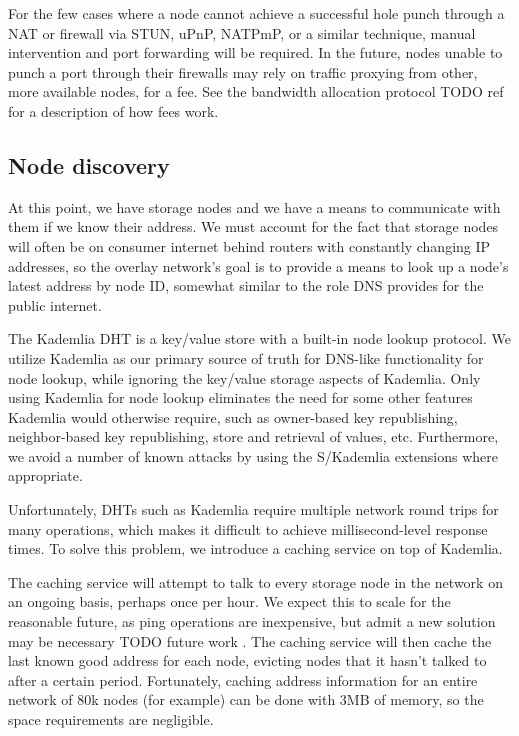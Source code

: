 \documentclass[a4paper,10pt]{article} \usepackage[utf8]{inputenc}
\newcommand{\todo}[1]{{\color{red} TODO #1 }}
\begin{document}
For the few cases where a node cannot achieve a successful hole punch through a
NAT or firewall via STUN, uPnP, NATPmP, or a similar technique, manual
intervention and port forwarding will be required. In the future, nodes unable
to punch a port through their firewalls may rely on traffic proxying from
other, more available nodes, for a fee. See the bandwidth allocation protocol
\todo{ref} for a description of how fees work.

\subsection{Node discovery}

At this point, we have storage nodes and we have a means to communicate with
them if we know their address. We must account for the fact that storage nodes
will often be on consumer internet behind routers with constantly changing IP
addresses, so the overlay network's goal is to provide a means to look up a
node's latest address by node ID, somewhat similar to the role DNS provides
for the public internet.

The Kademlia DHT is a key/value store with a built-in node lookup protocol.
We utilize Kademlia as our primary source of truth for DNS-like
functionality for node lookup, while ignoring the key/value storage aspects of
Kademlia.
Only using Kademlia for node lookup eliminates the need for some other
features Kademlia would otherwise require, such as owner-based key
republishing, neighbor-based key republishing, store and retrieval of values,
etc. Furthermore, we avoid a number of known attacks by using the
S/Kademlia \cite{skad} extensions where appropriate.

Unfortunately, DHTs such as Kademlia require multiple network round trips for
many operations, which makes it difficult to achieve millisecond-level
response times. To solve this problem, we introduce a caching service on top
of Kademlia.

The caching service will attempt to talk to every storage node in the network
on an ongoing basis, perhaps once per hour. We expect this to scale for the
reasonable future, as ping operations are inexpensive, but admit a new solution
may be necessary \todo{future work}. The caching service will then cache
the last known good address for each node, evicting nodes that it hasn't talked
to after a certain period.
Fortunately, caching address information for an entire network of 80k nodes
(for example) can be done with 3MB of memory, so the space requirements are
negligible.
\end{document}
